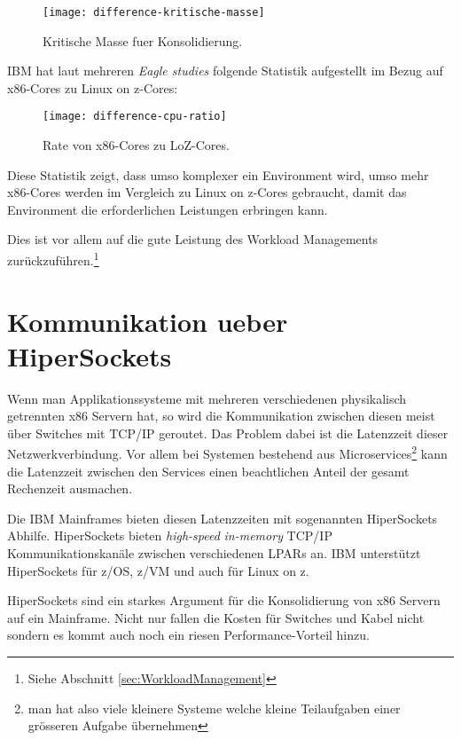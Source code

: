 \begin{figure}[h!]
\centering
\texttt{[image: difference-kritische-masse]}
\caption{Kritische Masse fuer Konsolidierung\cite{KonsolidierungKritischeMasse}.}
\label{fig:KonsolidierungKritischeMasse}
\end{figure}

IBM hat laut mehreren \textit{Eagle studies} folgende Statistik aufgestellt im Bezug auf x86-Cores zu Linux on z-Cores:

\begin{figure}[h!]
\centering
\texttt{[image: difference-cpu-ratio]}
\caption{Rate von x86-Cores zu LoZ-Cores\cite{CPURatio}.}
\label{fig:CPURatio}
\end{figure}

Diese Statistik zeigt, dass umso komplexer ein Environment wird, umso mehr x86-Cores werden im Vergleich zu Linux on z-Cores gebraucht,
damit das Environment die erforderlichen Leistungen erbringen kann.

Dies ist vor allem auf die gute Leistung des Workload Managements zurückzuführen.\footnote{Siehe Abschnitt \ref{sec:WorkloadManagement}}

\section{Kommunikation ueber HiperSockets}
\label{sec:HiperSockets}

Wenn man Applikationssysteme mit mehreren verschiedenen physikalisch getrennten x86 Servern hat, so wird die Kommunikation zwischen diesen meist über Switches mit TCP/IP geroutet. Das Problem dabei ist die Latenzzeit dieser Netzwerkverbindung.
Vor allem bei Systemen bestehend aus Microservices\footnote{man hat also viele kleinere Systeme welche kleine Teilaufgaben einer grösseren Aufgabe übernehmen} kann die Latenzzeit zwischen den Services einen beachtlichen Anteil der gesamt Rechenzeit ausmachen.

Die IBM Mainframes bieten diesen Latenzzeiten mit sogenannten HiperSockets Abhilfe.\cite{HiperSocketsWiki}
HiperSockets bieten \textit{high-speed} \textit{in-memory} TCP/IP Kommunikationskanäle zwischen verschiedenen LPARs an. IBM unterstützt HiperSockets für z/OS, z/VM und auch für Linux on z.

HiperSockets sind ein starkes Argument für die Konsolidierung von x86 Servern auf ein Mainframe. Nicht nur fallen die Kosten für Switches und Kabel nicht sondern es kommt auch noch ein riesen Performance-Vorteil hinzu.

